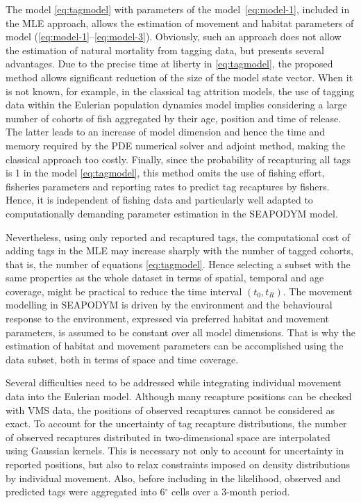 The model \hyperref[eq:tagmodel]{\ref*{eq:tagmodel}} with parameters of the model~\ref{eq:model-1}, included in the MLE approach, allows the estimation of movement and habitat parameters of model (\ref{eq:model-1}--\ref{eq:model-3}). Obviously, such an approach does not allow the estimation of natural mortality from tagging data, but presents several advantages. Due to the precise time at liberty in \hyperref[eq:tagmodel]{\ref*{eq:tagmodel}}, the proposed method allows significant reduction of the size of the model state vector. When it is not known, for example, in the classical tag attrition models, the use of tagging data within the Eulerian population dynamics model implies considering a large number of cohorts of fish aggregated by their age, position and time of release. The latter leads to an increase of model dimension and hence the time and memory required by the PDE numerical solver and adjoint method, making the classical approach too costly. Finally, since the probability of recapturing all tags is 1 in the model \hyperref[eq:tagmodel]{\ref*{eq:tagmodel}}, this method omits the use of fishing effort, fisheries parameters and reporting rates to predict tag recaptures by fishers. Hence, it is independent of fishing data and particularly well adapted to computationally demanding parameter estimation in the SEAPODYM model.

Nevertheless, using only reported and recaptured tags, the computational cost of adding tags in the MLE may increase sharply with the number of tagged cohorts, that is, the number of equations \hyperref[eq:tagmodel]{\ref*{eq:tagmodel}}. Hence selecting a subset with the same properties as the whole dataset in terms of spatial, temporal and age coverage, might be practical to reduce the time interval $(t_0,t_{R})$. The movement modelling in SEAPODYM is driven by the environment and the behavioural response to the environment, expressed via preferred habitat and movement parameters, is assumed to be constant over all model dimensions. That is why the estimation of habitat and movement parameters can be accomplished using the data subset, both in terms of space and time coverage. 

Several difficulties need to be addressed while integrating individual movement data into the Eulerian model. Although many recapture positions can be checked with VMS data, the positions of observed recaptures cannot be considered as exact. To account for the uncertainty of tag recapture distributions, the number of observed recaptures distributed in two-dimensional space are interpolated using Gaussian kernels. This is necessary not only to account for uncertainty in reported positions, but also to relax constraints imposed on density distributions by individual movement. Also, before including in the likelihood, observed and predicted tags were aggregated into 6$^\circ$ cells over a 3-month period. 

